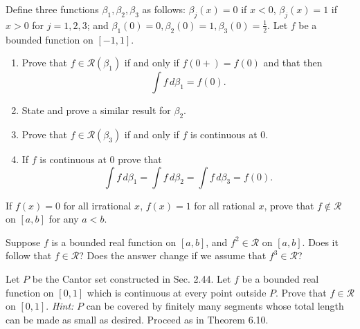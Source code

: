   \begin{exercise}[Rudin 6.3]
    Define three functions $\beta_1, \beta_2, \beta_3$ as follows: $\beta_j(x) = 0$ if $x < 0$, $\beta_j(x) = 1$ if $x > 0$ for $j = 1, 2, 3$; and $\beta_1(0) = 0, \beta_2(0) = 1, \beta_3(0) = \frac{1}{2}$. Let $f$ be a bounded function on $[-1, 1]$.
    \begin{enumerate}
      \item[(a)] Prove that $f \in \mathscr{R}(\beta_1)$ if and only if $f(0+) = f(0)$ and that then
      \begin{equation}
        \int f \, d\beta_1 = f(0).
      \end{equation}
      \item[(b)] State and prove a similar result for $\beta_2$.
      \item[(c)] Prove that $f \in \mathscr{R}(\beta_3)$ if and only if $f$ is continuous at 0.
      \item[(d)] If $f$ is continuous at 0 prove that
      \begin{equation}
        \int f \, d\beta_1 = \int f \, d\beta_2 = \int f \, d\beta_3 = f(0).
      \end{equation}
    \end{enumerate}
  \end{exercise}
  \begin{solution}

  \end{solution}

  \begin{exercise}[Rudin 6.4]
    If $f(x) = 0$ for all irrational $x$, $f(x) = 1$ for all rational $x$, prove that $f \notin \mathscr{R}$ on $[a, b]$ for any $a < b$.
  \end{exercise}
  \begin{solution}

  \end{solution}

  \begin{exercise}[Rudin 6.5]
    Suppose $f$ is a bounded real function on $[a, b]$, and $f^2 \in \mathscr{R}$ on $[a, b]$. Does it follow that $f \in \mathscr{R}$? Does the answer change if we assume that $f^3 \in \mathscr{R}$?
  \end{exercise}
  \begin{solution}

  \end{solution}

  \begin{exercise}[Rudin 6.6]
    Let $P$ be the Cantor set constructed in Sec. 2.44. Let $f$ be a bounded real function on $[0, 1]$ which is continuous at every point outside $P$. Prove that $f \in \mathscr{R}$ on $[0, 1]$. \textit{Hint:} $P$ can be covered by finitely many segments whose total length can be made as small as desired. Proceed as in Theorem 6.10.
  \end{exercise}
  \begin{solution}

  \end{solution}

